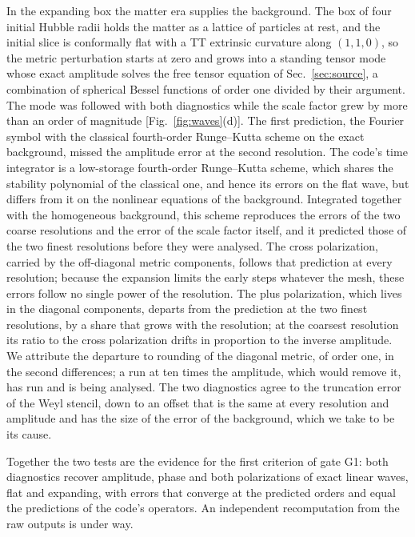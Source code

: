 \documentclass[aps,prd,twocolumn,10pt,superscriptaddress,nofootinbib,longbibliography,floatfix]{revtex4-2}
\begin{document}
In the expanding box the matter era supplies the background. The box of four initial Hubble radii holds the matter as a lattice of particles at rest, and the initial slice is conformally flat with a TT extrinsic curvature along $(1,1,0)$, so the metric perturbation starts at zero and grows into a standing tensor mode whose exact amplitude solves the free tensor equation of Sec.~\ref{sec:source}, a combination of spherical Bessel functions of order one divided by their argument. The mode was followed with both diagnostics while the scale factor grew by more than an order of magnitude [Fig.~\ref{fig:waves}(d)]. The first prediction, the Fourier symbol with the classical fourth-order Runge--Kutta scheme on the exact background, missed the amplitude error at the second resolution. The code's time integrator is a low-storage fourth-order Runge--Kutta scheme, which shares the stability polynomial of the classical one, and hence its errors on the flat wave, but differs from it on the nonlinear equations of the background. Integrated together with the homogeneous background, this scheme reproduces the errors of the two coarse resolutions and the error of the scale factor itself, and it predicted those of the two finest resolutions before they were analysed. The cross polarization, carried by the off-diagonal metric components, follows that prediction at every resolution; because the expansion limits the early steps whatever the mesh, these errors follow no single power of the resolution. The plus polarization, which lives in the diagonal components, departs from the prediction at the two finest resolutions, by a share that grows with the resolution; at the coarsest resolution its ratio to the cross polarization drifts in proportion to the inverse amplitude. We attribute the departure to rounding of the diagonal metric, of order one, in the second differences; a run at ten times the amplitude, which would remove it, has run and is being analysed. The two diagnostics agree to the truncation error of the Weyl stencil, down to an offset that is the same at every resolution and amplitude and has the size of the error of the background, which we take to be its cause.

Together the two tests are the evidence for the first criterion of gate G1: both diagnostics recover amplitude, phase and both polarizations of exact linear waves, flat and expanding, with errors that converge at the predicted orders and equal the predictions of the code's operators. An independent recomputation from the raw outputs is under way.
\end{document}
